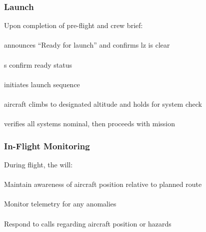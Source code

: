         \subsubsection{Launch} Upon completion of pre-flight and crew brief:

            \paragraph{}  announces ``Ready for launch'' and confirms \ac{lz} is clear
            \paragraph{} s confirm ready status
            \paragraph{}  initiates launch sequence
            \paragraph{} aircraft climbs to designated altitude and holds for system check
            \paragraph{}  verifies all systems nominal, then proceeds with mission

        \subsubsection{In-Flight Monitoring} During flight, the  will:

            \paragraph{} Maintain awareness of aircraft position relative to planned route
            \paragraph{} Monitor telemetry for any anomalies
            \paragraph{} Respond to  calls regarding aircraft position or hazards
